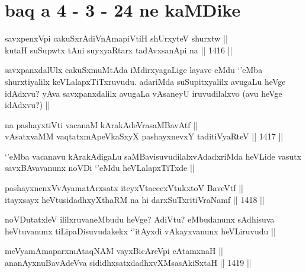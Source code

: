 \section*{baq a 4 - 3 - 24 ne kaMDike}

\begin{shl}
savxpenxV\s pi cakuSxrAdiVnAmapiVtiH shUrxyteV shurxtw || \\
kutaH suSupwtx tAni suyxyaRtarx tadAvxsanA\s pi na ||  1416 ||  
\end{shl}

\begin{artha}
savxpanxdalUlx cakuSxmuMtAda iMdirxyagaLige layave eMdu `\stext'eMba shurxtiyalilx keVLalapxTiTxruvudu. adariMda suSupitxyalilx avugaLu heVge idAdxvu? yAva savxpanxdalilx avugaLa vAsaneyU iruvudilalxvo (avu heVge idAdxvu?) ||
\end{artha}

\begin{shl}
na pashayxtiVti vacanaM kArakAdeVrasaMBavAtf || \\
vAsatxvaMM vaqtatxmApeVkaSxyX pashayxnevxY taditiVyaRteV ||  1417 ||  
\end{shl}

\begin{artha}
`\stext'eMba vacanavu kArakAdigaLu saMBavisuvudilalxvAdadxriMda heVLide vasutx savxBAvavanunx noVDi `\stext'eMdu heVLalapxTiTxde ||
\end{artha}

\begin{shl}
pashayxnenxVvAyamatArx\s \s satx iteyxVtacecxVtukxtoV BaveVtf ||  \\
itayxsayx heVtusidadhxyXthaRM na hi darxSuTxritiVraNamf ||  1418 || 
\end{shl}

\begin{artha}
noVDutatxleV ililxruvaneMbudu heVge? AdiVtu? eMbudanunx sAdhisuva heVtuvanunx tiLipaDisuvudakekx `\stext'itAyxdi vAkayxvanunx heVLiruvudu ||
\end{artha}


\begin{shl}
meVyamAmaparxmAtaqNAM vayxBicAreV\s pi cA\s \s tamxnaH || \\
ananAyxnuBavAdeVva sididhxsatxdadhxvXMsasAkiSxtaH ||  1419 ||  
\end{shl}

